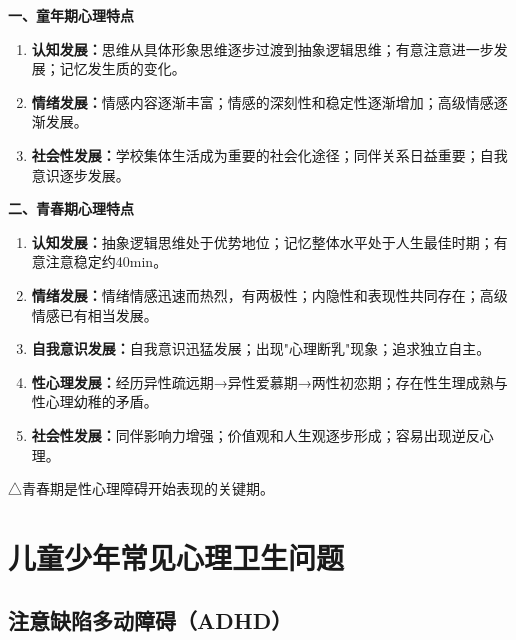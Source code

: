 \begin{keybox}
\textbf{一、童年期心理特点}

\begin{enumerate}[leftmargin=*]
    \item \textbf{认知发展：}思维从具体形象思维逐步过渡到抽象逻辑思维；有意注意进一步发展；记忆发生质的变化。
    \item \textbf{情绪发展：}情感内容逐渐丰富；情感的深刻性和稳定性逐渐增加；高级情感逐渐发展。
    \item \textbf{社会性发展：}学校集体生活成为重要的社会化途径；同伴关系日益重要；自我意识逐步发展。
\end{enumerate}

\textbf{二、青春期心理特点}

\begin{enumerate}[leftmargin=*]
    \item \textbf{认知发展：}抽象逻辑思维处于优势地位；记忆整体水平处于人生最佳时期；有意注意稳定约40min。
    \item \textbf{情绪发展：}情绪情感迅速而热烈，有两极性；内隐性和表现性共同存在；高级情感已有相当发展。
    \item \textbf{自我意识发展：}自我意识迅猛发展；出现"心理断乳"现象；追求独立自主。
    \item \textbf{性心理发展：}经历异性疏远期→异性爱慕期→两性初恋期；存在性生理成熟与性心理幼稚的矛盾。
    \item \textbf{社会性发展：}同伴影响力增强；价值观和人生观逐步形成；容易出现逆反心理。
\end{enumerate}

△青春期是性心理障碍开始表现的关键期。
\end{keybox}

\section{儿童少年常见心理卫生问题}

\subsection{注意缺陷多动障碍（ADHD）}


